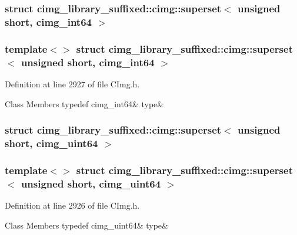 \subsubsection{struct cimg\+\_\+library\+\_\+suffixed\+:\+:cimg\+:\+:superset$<$ unsigned short, cimg\+\_\+int64 $>$}
\subsubsection*{template$<$$>$\newline
struct cimg\+\_\+library\+\_\+suffixed\+::cimg\+::superset$<$ unsigned short, cimg\+\_\+int64 $>$}



Definition at line 2927 of file C\+Img.\+h.

\begin{DoxyFields}{Class Members}
\mbox{\label{namespacecimg__library__suffixed_1_1cimg_a77bfac105e6337a09d7828b6469ba647}} 
typedef cimg\_int64&
type&
\\
\hline

\end{DoxyFields}
\label{structcimg__library__suffixed_1_1cimg_1_1superset_3_01unsigned_01short_00_01cimg__uint64_01_4}
\subsubsection{struct cimg\+\_\+library\+\_\+suffixed\+:\+:cimg\+:\+:superset$<$ unsigned short, cimg\+\_\+uint64 $>$}
\subsubsection*{template$<$$>$\newline
struct cimg\+\_\+library\+\_\+suffixed\+::cimg\+::superset$<$ unsigned short, cimg\+\_\+uint64 $>$}



Definition at line 2926 of file C\+Img.\+h.

\begin{DoxyFields}{Class Members}
\mbox{\label{namespacecimg__library__suffixed_1_1cimg_acad4cb58562c4d687f15b11f5cd0bcce}} 
typedef cimg\_uint64&
type&
\\
\hline

\end{DoxyFields}
\label{structcimg__library__suffixed_1_1cimg_1_1superset_3_01unsigned_01short_00_01double_01_4}
